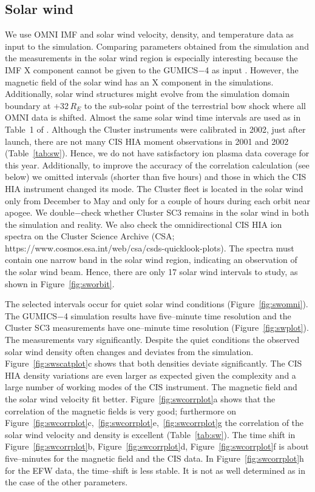 \documentclass[linenumbers,draft]{agujournal}
\begin{document}
\subsection{Solar wind}
\label{sec:sw}

We use OMNI IMF and solar wind velocity, density, and temperature data as input to the simulation. Comparing parameters obtained from the simulation and the measurements in the solar wind region is especially interesting because the IMF X component cannot be given to the GUMICS$-$4 as input \citep{janhunen12:_gumic_mhd,facsko16:_one_earth}. However, the magnetic field of the solar wind has an X component in the simulations. Additionally, solar wind structures might evolve from the simulation domain boundary at +32\,$R_E$ to the sub-solar point of the terrestrial bow shock where all OMNI data is shifted. Almost the same solar wind time intervals are used as in Table~1 of \citet{facsko16:_one_earth}. Although the Cluster instruments were calibrated in 2002, just after launch, there are not many CIS HIA moment observations in 2001 and 2002 (Table~\ref{tab:sw}). Hence, we do not have satisfactory ion plasma data coverage for this year. Additionally, to improve the accuracy of the correlation calculation (see below) we omitted intervals (shorter than five hours) and those in which the CIS HIA instrument changed its mode. The Cluster fleet is located in the solar wind only from December to May and only for a couple of hours during each orbit near apogee. We double$-$check whether Cluster SC3 remains in the solar wind in both the simulation and reality. We also check the omnidirectional CIS HIA ion spectra on the Cluster Science Archive (CSA; https://www.cosmos.esa.int/web/csa/csds-quicklook-plots). The spectra must contain one narrow band in the solar wind region, indicating an observation of the solar wind beam. Hence, there are only 17 solar wind intervals to study, as shown in Figure~\ref{fig:sworbit}. 

The selected intervals occur for quiet solar wind conditions (Figure~\ref{fig:swomni}). The GUMICS$-$4 simulation results have five--minute time resolution and the Cluster SC3 measurements have one--minute time resolution (Figure~\ref{fig:swplot}). The measurements vary significantly. Despite the quiet conditions the observed solar wind density often changes and deviates from the simulation. Figure~\ref{fig:swscatplot}c shows that both densities deviate significantly. The CIS HIA density variations are even larger as expected given the complexity and a large number of working modes of the CIS instrument. The magnetic field and the solar wind velocity fit better. Figure~\ref{fig:swcorrplot}a shows that the correlation of the magnetic fields is very good; furthermore on Figure~\ref{fig:swcorrplot}c,~\ref{fig:swcorrplot}e,~\ref{fig:swcorrplot}g the correlation of the solar wind velocity and density is excellent (Table~\ref{tab:sw}). The time shift in Figure~\ref{fig:swcorrplot}b, Figure~\ref{fig:swcorrplot}d, Figure~\ref{fig:swcorrplot}f is about five--minutes for the magnetic field and the CIS data. In Figure~\ref{fig:swcorrplot}h for the EFW data, the time--shift is less stable. It is not as well determined as in the case of the other parameters.
\end{document}
